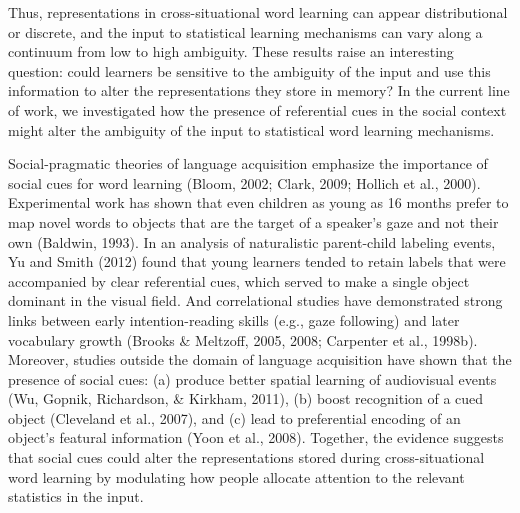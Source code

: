 \documentclass[oneside]{report}
\begin{document}
Thus, representations in cross-situational word learning can appear
distributional or discrete, and the input to statistical learning
mechanisms can vary along a continuum from low to high ambiguity. These
results raise an interesting question: could learners be sensitive to
the ambiguity of the input and use this information to alter the
representations they store in memory? In the current line of work, we
investigated how the presence of referential cues in the social context
might alter the ambiguity of the input to statistical word learning
mechanisms.

Social-pragmatic theories of language acquisition emphasize the
importance of social cues for word learning (Bloom, 2002; Clark, 2009;
Hollich et al., 2000). Experimental work has shown that even children as
young as 16 months prefer to map novel words to objects that are the
target of a speaker's gaze and not their own (Baldwin, 1993). In an
analysis of naturalistic parent-child labeling events, Yu and Smith
(2012) found that young learners tended to retain labels that were
accompanied by clear referential cues, which served to make a single
object dominant in the visual field. And correlational studies have
demonstrated strong links between early intention-reading skills (e.g.,
gaze following) and later vocabulary growth (Brooks \& Meltzoff, 2005,
2008; Carpenter et al., 1998b). Moreover, studies outside the domain of
language acquisition have shown that the presence of social cues: (a)
produce better spatial learning of audiovisual events (Wu, Gopnik,
Richardson, \& Kirkham, 2011), (b) boost recognition of a cued object
(Cleveland et al., 2007), and (c) lead to preferential encoding of an
object's featural information (Yoon et al., 2008). Together, the
evidence suggests that social cues could alter the representations
stored during cross-situational word learning by modulating how people
allocate attention to the relevant statistics in the input.
\end{document}
